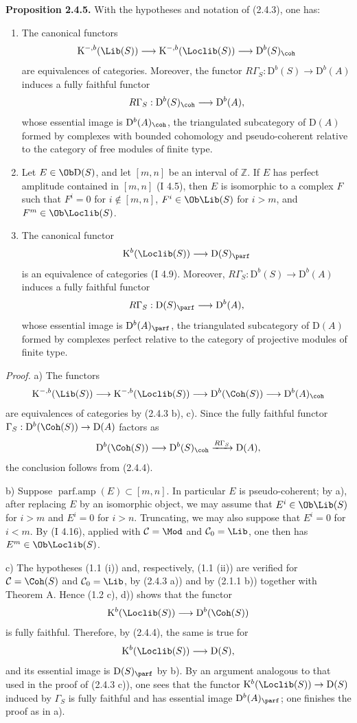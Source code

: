 \textbf{Proposition 2.4.5.} With the hypotheses and notation of (2.4.3), one has:
\begin{enumerate}[label=\alph*)]
\item The canonical functors
\[
\mathrm K^{-,b}(\Lib(S))\longrightarrow\mathrm K^{-,b}(\Loclib(S))\longrightarrow \mathrm D^b(S)_{\coh}
\]
are equivalences of categories. Moreover, the functor $R\Gamma_S:\mathrm D^b(S)\to\mathrm D^b(A)$ induces a fully faithful functor
\[
R\Gamma_S:\mathrm D^b(S)_{\coh}\longrightarrow \mathrm D^b(A),
\]
whose essential image is $\mathrm D^b(A)_{\coh}$, the triangulated subcategory of $\mathrm D(A)$ formed by complexes with bounded cohomology and pseudo-coherent relative to the category of free modules of finite type.
\item Let $E\in\Ob\mathrm D(S)$, and let $[m,n]$ be an interval of $\mathbb Z$. If $E$ has perfect amplitude contained in $[m,n]$ (I 4.5), then $E$ is isomorphic to a complex $F$ such that $F^i=0$ for $i\notin[m,n]$, $F^i\in\Ob\Lib(S)$ for $i>m$, and $F^m\in\Ob\Loclib(S)$.
\item The canonical functor
\[
\mathrm K^b(\Loclib(S))\longrightarrow \mathrm D(S)_{\parf}
\]
is an equivalence of categories (I 4.9). Moreover, $R\Gamma_S:\mathrm D^b(S)\to\mathrm D^b(A)$ induces a fully faithful functor
\[
R\Gamma_S:\mathrm D(S)_{\parf}\longrightarrow\mathrm D^b(A),
\]
whose essential image is $\mathrm D^b(A)_{\parf}$, the triangulated subcategory of $\mathrm D(A)$ formed by complexes perfect relative to the category of projective modules of finite type.
\end{enumerate}

\emph{Proof.} a) The functors
\[
\mathrm K^{-,b}(\Lib(S))\longrightarrow\mathrm K^{-,b}(\Loclib(S))\longrightarrow
\mathrm D^b(\Coh(S))\longrightarrow\mathrm D^b(A)_{\coh}
\]
are equivalences of categories by (2.4.3 b), c). Since the fully faithful functor $\Gamma_S:\mathrm D^b(\Coh(S))\to\mathrm D(A)$ factors as
\[
\mathrm D^b(\Coh(S))\longrightarrow\mathrm D^b(S)_{\coh}\xrightarrow{R\Gamma_S}\mathrm D(A),
\]
the conclusion follows from (2.4.4).

b) Suppose $\operatorname{parf.amp}(E)\subset[m,n]$. In particular $E$ is pseudo-coherent; by a), after replacing $E$ by an isomorphic object, we may assume that $E^i\in\Ob\Lib(S)$ for $i>m$ and $E^i=0$ for $i>n$. Truncating, we may also suppose that $E^i=0$ for $i<m$. By (I 4.16), applied with $\mathcal C=\Mod$ and $\mathcal C_0=\Lib$, one then has $E^m\in\Ob\Loclib(S)$.

c) The hypotheses (1.1 (i)) and, respectively, (1.1 (ii)) are verified for $\mathcal C=\Coh(S)$ and $\mathcal C_0=\Lib$, by (2.4.3 a)) and by (2.1.1 b)) together with Theorem A. Hence (1.2 c), d)) shows that the functor
\[
\mathrm K^b(\Loclib(S))\longrightarrow\mathrm D^b(\Coh(S))
\]
is fully faithful. Therefore, by (2.4.4), the same is true for
\[
\mathrm K^b(\Loclib(S))\longrightarrow\mathrm D(S),
\]
and its essential image is $\mathrm D(S)_{\parf}$ by b). By an argument analogous to that used in the proof of (2.4.3 c)), one sees that the functor $\mathrm K^b(\Loclib(S))\to\mathrm D(S)$ induced by $\Gamma_S$ is fully faithful and has essential image $\mathrm D^b(A)_{\parf}$; one finishes the proof as in a).

